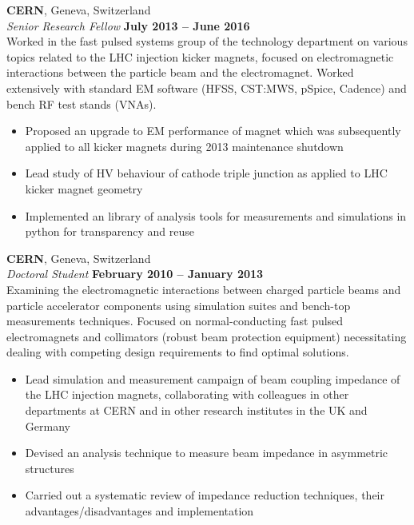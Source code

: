\documentclass[margin,line]{resume}
\begin{document}
\begin{resume}
    \textbf{CERN}, Geneva, Switzerland \vspace{1mm}\\\vspace{1mm}%
    \textsl{Senior Research Fellow} \hfill \textbf{July 2013 -- June 2016}\\
    Worked in the fast pulsed systems group of the technology department on various topics related to the LHC injection kicker magnets, focused on electromagnetic interactions between the particle beam and the electromagnet. Worked extensively with standard EM software (HFSS, CST:MWS, pSpice, Cadence) and bench RF test stands (VNAs).
    \begin{itemize}
    \item{Proposed an upgrade to EM performance of magnet which was subsequently applied to all kicker magnets during 2013 maintenance shutdown}
    \item{Lead study of HV behaviour of cathode triple junction as applied to LHC kicker magnet geometry}
    \item{Implemented an library of analysis tools for measurements and simulations in python for transparency and reuse}
    \end{itemize}

    \textbf{CERN}, Geneva, Switzerland \vspace{1mm}\\\vspace{1mm}%
    \textsl{Doctoral Student} \hfill \textbf{February 2010 -- January 2013}\\
    Examining the electromagnetic interactions between charged particle beams and particle accelerator components using simulation suites and bench-top measurements techniques. Focused on normal-conducting fast pulsed electromagnets and collimators (robust beam protection equipment) necessitating dealing with competing design requirements to find optimal solutions. 
    \begin{itemize}
    \item{Lead simulation and measurement campaign of beam coupling impedance of the LHC injection magnets, collaborating with colleagues in other departments at CERN and in other research institutes in the UK and Germany}
    \item{Devised an analysis technique to measure beam impedance in asymmetric structures}
    \item{Carried out a systematic review of impedance reduction techniques, their advantages/disadvantages and implementation}
    \end{itemize}


\end{resume}
\end{document}
